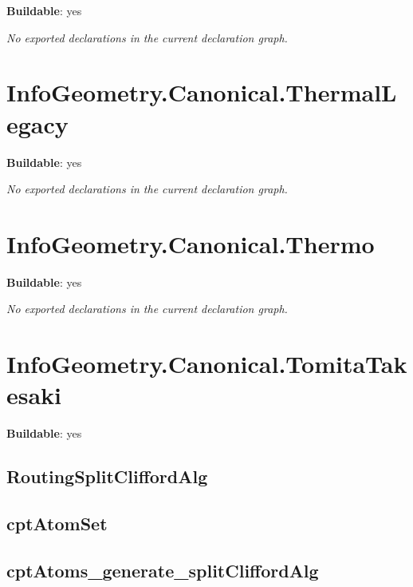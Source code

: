 \noindent\textbf{Buildable}: yes

\noindent\emph{No exported declarations in the current declaration graph.}

\section{InfoGeometry.Canonical.ThermalLegacy}

\noindent\textbf{Buildable}: yes

\noindent\emph{No exported declarations in the current declaration graph.}

\section{InfoGeometry.Canonical.Thermo}

\noindent\textbf{Buildable}: yes

\noindent\emph{No exported declarations in the current declaration graph.}

\section{InfoGeometry.Canonical.TomitaTakesaki}

\noindent\textbf{Buildable}: yes

\subsection*{RoutingSplitCliffordAlg}

\begin{theorem}[blueprint="infogeometry:canonical:tomitatakesaki:routingsplitcliffordalg"]
\end{theorem}

\subsection*{cptAtomSet}

\begin{theorem}[blueprint="infogeometry:canonical:tomitatakesaki:cptatomset"]
\end{theorem}

\subsection*{cptAtoms_generate_splitCliffordAlg}

